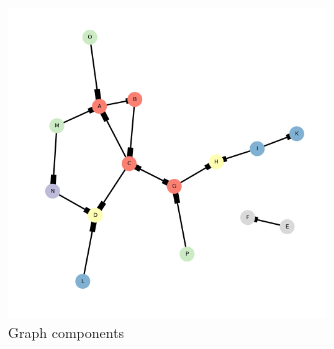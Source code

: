 \documentclass[12pt, a4paper]{article}
\begin{document}
\begin{figure}[h]
    \centering
    \caption{Graph components}
    \includegraphics[width=0.75\textwidth]{dia/graph_components.png}
\end{figure}
\end{document}
